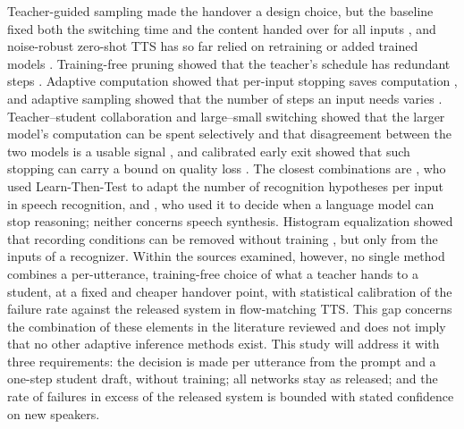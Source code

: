 Teacher-guided sampling made the handover a design choice, but the baseline fixed both the switching time and the content handed over for all inputs \parencite{li2025dmospeech2}, and noise-robust zero-shot TTS has so far relied on retraining or added trained models \parencite{wang2024noise,fujita2024noiserobust,lu2025noise}. Training-free pruning showed that the teacher's schedule has redundant steps \parencite{zheng2025epss}. Adaptive computation showed that per-input stopping saves computation \parencite{graves2016act,teerapittayanon2016branchynet}, and adaptive sampling showed that the number of steps an input needs varies \parencite{bajpai2026fastflow,bajpai2026coflow,zhang2025adadiff}. Teacher--student collaboration and large--small switching showed that the larger model's computation can be spent selectively and that disagreement between the two models is a usable signal \parencite{starodubcev2024your,munir2026track,sun2026hybridstitch}, and calibrated early exit showed that such stopping can carry a bound on quality loss \parencite{angelopoulos2025ltt,jazbec2024fast,schuster2022calm}. The closest combinations are \textcite{damri2026confident}, who used Learn-Then-Test to adapt the number of recognition hypotheses per input in speech recognition, and \textcite{wu2025thought}, who used it to decide when a language model can stop reasoning; neither concerns speech synthesis. Histogram equalization showed that recording conditions can be removed without training \parencite{hilger2006quantile}, but only from the inputs of a recognizer. Within the sources examined, however, no single method combines a per-utterance, training-free choice of what a teacher hands to a student, at a fixed and cheaper handover point, with statistical calibration of the failure rate against the released system in flow-matching TTS. This gap concerns the combination of these elements in the literature reviewed and does not imply that no other adaptive inference methods exist. This study will address it with three requirements: the decision is made per utterance from the prompt and a one-step student draft, without training; all networks stay as released; and the rate of failures in excess of the released system is bounded with stated confidence on new speakers.

\FloatBarrier
